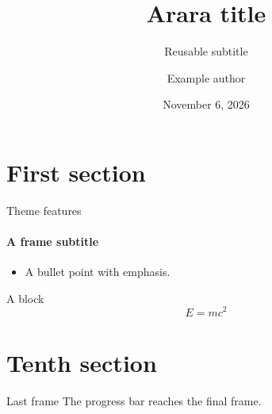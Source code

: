\documentclass{beamer}
\title{Arara title}
\subtitle{Reusable subtitle}
\author{Example author}
\institute{Example institute}
\date{November 6, 2026}
\begin{document}
\maketitle
\section{First section}
\begin{frame}{Theme features}
  \framesubtitle{A frame subtitle}
  \begin{itemize}
    \item A bullet point with \alert{emphasis}.
  \end{itemize}
  \begin{block}{A block}
    \[ E = mc^2 \]
  \end{block}
\end{frame}
\setcounter{section}{9}
\section{Tenth section}
\begin{frame}{Last frame}
  The progress bar reaches the final frame.
\end{frame}
\end{document}
